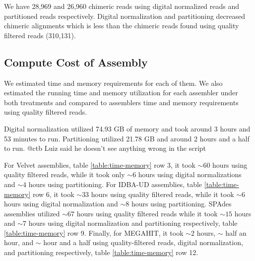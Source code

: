 We have 28,969 and 26,960 chimeric
reads using digital normalized reads and partitioned reads
respectively. Digital normalization and partitioning decreased
chimeric alignments which is less than the chimeric reads found using quality filtered reads (310,131). %

\subsection*{Compute Cost of Assembly} 
We estimated time and memory requirements for each of them. We also estimated the running time and memory utilization for each assembler under both treatments and compared to assemblers time and memory requirements using quality filtered reads.  

Digital normalization utilized 74.93 GB of memory and took around 3
hours and 53 minutes to run. Partitioning utilized 21.78 GB and around
2 hours and a half to run. @ctb Luiz said he doesn't see anything wrong in the script

For Velvet assemblies, table \ref{table:time-memory} row 3, it took $\sim 60$ hours using quality filtered reads, while it took only $\sim 6$ hours using digital normalizations
and $\sim 4$ hours using partitioning.  For IDBA-UD assemblies, table \ref{table:time-memory} row 6, it took $\sim 33$ hours using quality filtered reads, while it took $\sim 6$
hours using digital normalization and $\sim 8$ hours using
partitioning.  SPAdes assemblies utilized $\sim 67$ hours using quality
filtered reads while it took $\sim15$ hours and $\sim 7$ hours using
digital normalization and partitioning respectively, table \ref{table:time-memory} row 9. Finally, for
MEGAHIT, it took $\sim 2$ hours, $\sim$ half an hour, and $\sim$ hour
and a half using quality-filtered reads, digital normalization, and
partitioning respectively, table \ref{table:time-memory} row 12.
 

